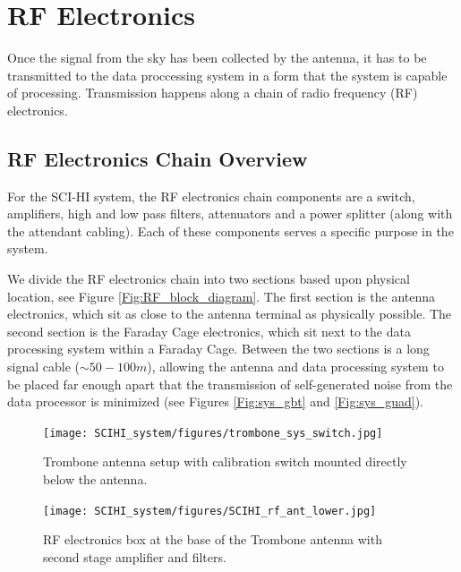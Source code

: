 \section{RF Electronics}

Once the signal from the sky has been collected by the antenna, it has to be transmitted to the data proccessing system in a form that the system is capable of processing. Transmission happens along a chain of radio frequency (RF) electronics. 


\subsection{RF Electronics Chain Overview}

For the SCI-HI system, the RF electronics chain components are a switch, amplifiers, high and low pass filters, attenuators and a power splitter (along with the attendant cabling). Each of these components serves a specific purpose in the system. 

We divide the RF electronics chain into two sections based upon physical location, see Figure \ref{Fig:RF_block_diagram}. The first section is the antenna electronics, which sit as close to the antenna terminal as physically possible. The second section is the Faraday Cage electronics, which sit next to the data processing system within a Faraday Cage. Between the two sections is a long signal cable ($\sim50-100 m$), allowing the antenna and data processing system to be placed far enough apart that the transmission of self-generated noise from the data processor is minimized (see Figures \ref{Fig:sys_gbt} and \ref{Fig:sys_guad}).

\begin{figure}[htb]
\centering
\begin{minipage}[b]{0.47\textwidth}
\centering
\texttt{[image: SCIHI\_system/figures/trombone\_sys\_switch.jpg]}
\caption{Trombone antenna setup with calibration switch mounted directly below the antenna.}
\label{Fig:trombone_switch}
\end{minipage}%
\begin{minipage}[b]{0.02\textwidth}
\hspace{1cm}
\end{minipage}%
\begin{minipage}[b]{0.47\textwidth}
\centering
\texttt{[image: SCIHI\_system/figures/SCIHI\_rf\_ant\_lower.jpg]}
\caption{RF electronics box at the base of the Trombone antenna with second stage amplifier and filters.}
\label{Fig:trombone_base}
\end{minipage}
\end{figure}

